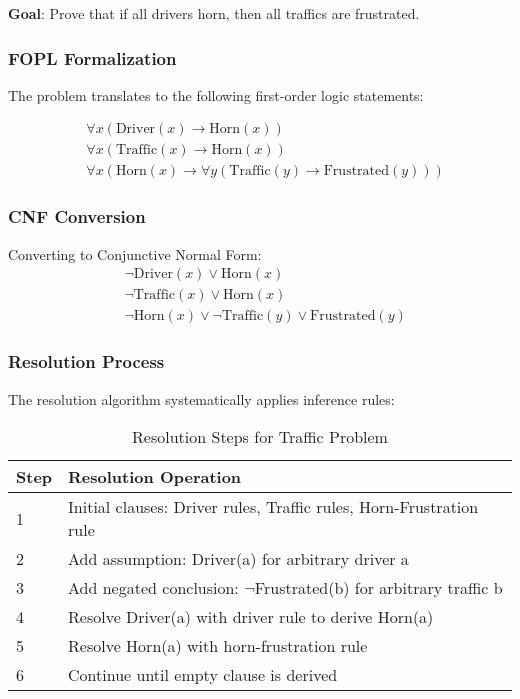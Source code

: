 \documentclass[11pt,a4paper]{article}
\begin{document}
\textbf{Goal}: Prove that if all drivers horn, then all traffics are frustrated.

\subsubsection{FOPL Formalization}

The problem translates to the following first-order logic statements:

\begin{align}
&\forall x (\text{Driver}(x) \rightarrow \text{Horn}(x)) \\
&\forall x (\text{Traffic}(x) \rightarrow \text{Horn}(x)) \\
&\forall x (\text{Horn}(x) \rightarrow \forall y (\text{Traffic}(y) \rightarrow \text{Frustrated}(y)))
\end{align}

\subsubsection{CNF Conversion}

Converting to Conjunctive Normal Form:
\begin{align}
&\neg\text{Driver}(x) \vee \text{Horn}(x) \\
&\neg\text{Traffic}(x) \vee \text{Horn}(x) \\
&\neg\text{Horn}(x) \vee \neg\text{Traffic}(y) \vee \text{Frustrated}(y)
\end{align}

\subsubsection{Resolution Process}

The resolution algorithm systematically applies inference rules:

\begin{table}[H]
\centering
\caption{Resolution Steps for Traffic Problem}
\begin{tabular}{|l|p{8cm}|}
\hline
\textbf{Step} & \textbf{Resolution Operation} \\
\hline
1 & Initial clauses: Driver rules, Traffic rules, Horn-Frustration rule \\
2 & Add assumption: Driver(a) for arbitrary driver a \\
3 & Add negated conclusion: $\neg$Frustrated(b) for arbitrary traffic b \\
4 & Resolve Driver(a) with driver rule to derive Horn(a) \\
5 & Resolve Horn(a) with horn-frustration rule \\
6 & Continue until empty clause is derived \\
\hline
\end{tabular}
\end{table}
\end{document}
